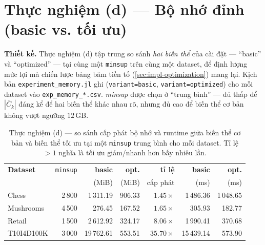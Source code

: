 \section{Thực nghiệm (d) --- Bộ nhớ đỉnh (basic vs. tối ưu)}
\label{sec:exp-d}

\textbf{Thiết kế.} Thực nghiệm (d) tập trung so sánh \emph{hai biến thể} của cài đặt --- ``basic'' và ``optimized'' --- tại cùng một \texttt{minsup} trên cùng một dataset, để định lượng mức lợi mà chiến lược bảng băm tiền tố (\autoref{sec:impl-optimization}) mang lại. Kịch bản \texttt{experiment\_memory.jl} ghi (\texttt{variant=basic}, \texttt{variant=optimized}) cho mỗi dataset vào \texttt{exp\_memory\_*.csv}. \textit{minsup} được chọn ở ``trung bình'' --- đủ thấp để $|\overline{C}_k|$ đáng kể để hai biến thể khác nhau rõ, nhưng đủ cao để biến thể cơ bản không vượt ngưỡng $12$\,GB.

\begin{table}[htbp]
    \centering
    \caption{Thực nghiệm (d) --- so sánh cấp phát bộ nhớ và runtime giữa biến thể cơ bản và biến thể tối ưu tại một \texttt{minsup} trung bình cho mỗi dataset. Tỉ lệ $>1$ nghĩa là tối ưu giảm/nhanh hơn bấy nhiêu lần.}
    \label{tab:exp-d}
    \begin{tabular}{l|r|r|r|r|r|r}
        \hline
        \textbf{Dataset} & \texttt{minsup} & \textbf{basic} & \textbf{opt.} & \textbf{tỉ lệ} & \textbf{basic} & \textbf{opt.} \\
        & & (MiB) & (MiB) & cấp phát & (ms) & (ms) \\ \hline
        Chess      & 2\,800 & 1\,311.19 & 906.33  & $1.45\times$  & 1\,486.36  & 1\,048.65 \\
        Mushrooms  & 4\,500 & 276.45    & 167.52  & $1.65\times$  & 305.93     & 182.77 \\
        Retail     & 1\,500 & 2\,612.92 & 324.17  & $8.06\times$  & 1\,990.41  & 370.68 \\
        T10I4D100K & 3\,000 & 19\,762.61 & 553.51 & $35.70\times$ & 15\,439.14 & 573.90 \\
        \hline
    \end{tabular}
\end{table}

